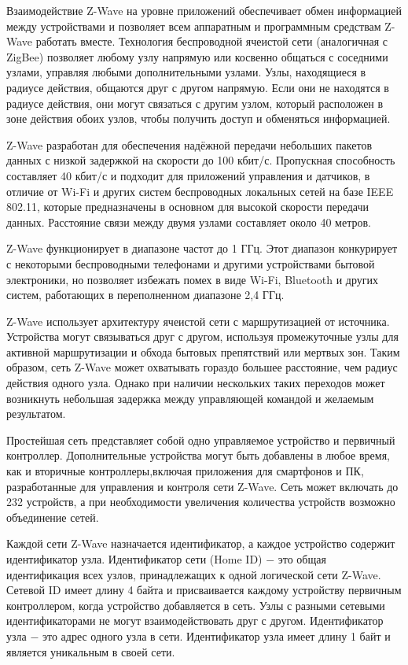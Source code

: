 	Взаимодействие Z-Wave на уровне приложений обеспечивает обмен информацией между устройствами 
	и позволяет всем аппаратным и программным средствам Z-Wave работать вместе. Технология беспроводной 
	ячеистой сети (аналогичная с ZigBee) позволяет любому узлу напрямую или косвенно общаться с соседними 
	узлами, управляя любыми дополнительными узлами. Узлы, находящиеся в радиусе действия, общаются друг 
	с другом напрямую. Если они не находятся в радиусе действия, они могут связаться с другим узлом, 
	который расположен в зоне действия обоих узлов, чтобы получить доступ и обменяться информацией.
	
	Z-Wave разработан для обеспечения надёжной передачи небольших пакетов данных с низкой задержкой 
	на скорости до 100 кбит/с. Пропускная способность составляет 40 кбит/с и подходит для приложений 
	управления и датчиков, в отличие от Wi-Fi и других систем беспроводных локальных сетей на базе IEEE 802.11, 
	которые предназначены в основном для высокой скорости передачи данных. Расстояние связи между 
	двумя узлами составляет около 40 метров.
	
	Z-Wave функционирует в диапазоне частот до 1 ГГц. Этот диапазон конкурирует с некоторыми беспроводными 
	телефонами и другими устройствами бытовой электроники, но позволяет избежать помех в виде Wi-Fi, Bluetooth 
	и других систем, работающих в переполненном диапазоне 2,4 ГГц.
	
	Z-Wave использует архитектуру ячеистой сети с маршрутизацией от источника. Устройства могут 
	связываться друг с другом, используя промежуточные узлы для активной маршрутизации и обхода 
	бытовых препятствий или мертвых зон. Таким образом, сеть Z-Wave может охватывать гораздо большее 
	расстояние, чем радиус действия одного узла. Однако при наличии нескольких таких переходов может 
	возникнуть небольшая задержка между управляющей командой и желаемым результатом.
	
	Простейшая сеть представляет собой одно управляемое устройство и первичный контроллер. Дополнительные 
	устройства могут быть добавлены в любое время, как и вторичные контроллеры,включая приложения 
	для смартфонов и ПК, разработанные для управления и контроля сети Z-Wave. Сеть может включать 
	до 232 устройств, а при необходимости увеличения количества устройств возможно объединение сетей.
	
	Каждой сети Z-Wave назначается идентификатор, а каждое устройство содержит идентификатор узла. 
	Идентификатор сети (Home ID) $-$ это общая идентификация всех узлов, принадлежащих к одной логической 
	сети Z-Wave. Сетевой ID имеет длину 4 байта и присваивается каждому устройству первичным контроллером, 
	когда устройство добавляется в сеть. Узлы с разными сетевыми идентификаторами не могут взаимодействовать 
	друг с другом. Идентификатор узла $-$ это адрес одного узла в сети. Идентификатор узла имеет 
	длину 1 байт и является уникальным в своей сети.
	
